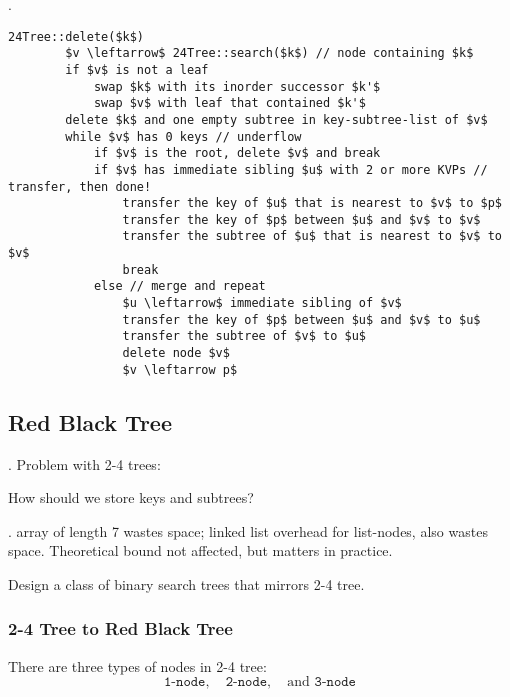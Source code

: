 \documentclass{article}
\begin{document}
\begin{codes}[].
    \begin{lstlisting}[style=cppstyle]
    24Tree::delete($k$)
        $v \leftarrow$ 24Tree::search($k$) // node containing $k$
        if $v$ is not a leaf
            swap $k$ with its inorder successor $k'$
            swap $v$ with leaf that contained $k'$
        delete $k$ and one empty subtree in key-subtree-list of $v$
        while $v$ has 0 keys // underflow
            if $v$ is the root, delete $v$ and break
            if $v$ has immediate sibling $u$ with 2 or more KVPs // transfer, then done!
                transfer the key of $u$ that is nearest to $v$ to $p$
                transfer the key of $p$ between $u$ and $v$ to $v$
                transfer the subtree of $u$ that is nearest to $v$ to $v$
                break
            else // merge and repeat
                $u \leftarrow$ immediate sibling of $v$
                transfer the key of $p$ between $u$ and $v$ to $u$
                transfer the subtree of $v$ to $u$
                delete node $v$
                $v \leftarrow p$
    \end{lstlisting}
\end{codes}

\subsection{Red Black Tree} 

\begin{discovery}[].
    Problem with 2-4 trees: 
    \begin{Question}{}
        How should we store keys and subtrees? 
    \end{Question}
    \begin{comm}[].
        array of length 7 wastes space; linked list overhead for list-nodes, also wastes space. Theoretical bound not affected, but matters in practice. 
    \end{comm}
\end{discovery}

\begin{solution}
    Design a class of binary search trees that mirrors 2-4 tree. 
\end{solution}

\subsubsection{2-4 Tree to Red Black Tree} 

There are three types of nodes in 2-4 tree: 
\[ \texttt{1-node}, \quad \texttt{2-node}, \quad \text{and } \texttt{3-node} \]
\end{document}

